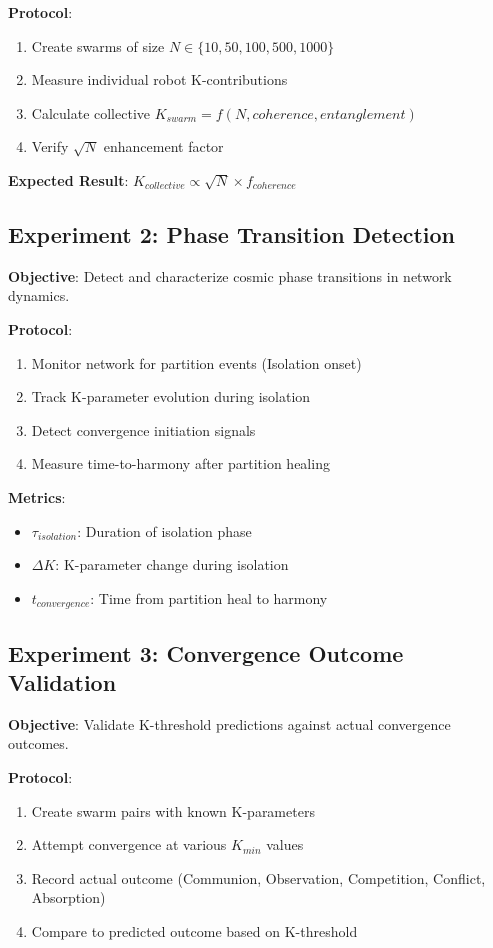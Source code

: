 \documentclass[12pt,a4paper]{article}
\begin{document}
\textbf{Protocol}:
\begin{enumerate}
    \item Create swarms of size $N \in \{10, 50, 100, 500, 1000\}$
    \item Measure individual robot K-contributions
    \item Calculate collective $K_{swarm} = f(N, coherence, entanglement)$
    \item Verify $\sqrt{N}$ enhancement factor
\end{enumerate}

\textbf{Expected Result}: $K_{collective} \propto \sqrt{N} \times f_{coherence}$

\subsection{Experiment 2: Phase Transition Detection}

\textbf{Objective}: Detect and characterize cosmic phase transitions in network dynamics.

\textbf{Protocol}:
\begin{enumerate}
    \item Monitor network for partition events (Isolation onset)
    \item Track K-parameter evolution during isolation
    \item Detect convergence initiation signals
    \item Measure time-to-harmony after partition healing
\end{enumerate}

\textbf{Metrics}:
\begin{itemize}
    \item $\tau_{isolation}$: Duration of isolation phase
    \item $\Delta K$: K-parameter change during isolation
    \item $t_{convergence}$: Time from partition heal to harmony
\end{itemize}

\subsection{Experiment 3: Convergence Outcome Validation}

\textbf{Objective}: Validate K-threshold predictions against actual convergence outcomes.

\textbf{Protocol}:
\begin{enumerate}
    \item Create swarm pairs with known K-parameters
    \item Attempt convergence at various $K_{min}$ values
    \item Record actual outcome (Communion, Observation, Competition, Conflict, Absorption)
    \item Compare to predicted outcome based on K-threshold
\end{enumerate}
\end{document}
